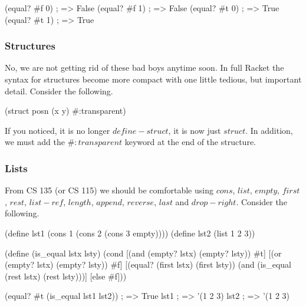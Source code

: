 \begin{code}[Lisp]
(equal? #f 0) ; => False
(equal? #f 1) ; => False
(equal? #t 0) ; => True
(equal? #t 1) ; => True
\end{code}

\subsubsection*{Structures}

No, we are not getting rid of these bad boys anytime soon. In full Racket the syntax for structures become more compact with one little tedious, but important detail. Consider the following.\\


\begin{code}[Lisp]
(struct posn (x y) #:transparent)
\end{code}

If you noticed, it is no longer $define-struct$, it is now just $struct$. In addition, we must add the $\#:transparent$ keyword at the end of the structure.\\


\subsubsection*{Lists}

From CS 135 (or CS 115) we should be comfortable using $cons$, $list$, $empty$, $first$, $rest$, $list-ref$, $length$, $append$, $reverse$, $last$ and $drop-right$. Consider the following.\\


\begin{code}[Lisp]
(define lst1 (cons 1 (cons 2 (cons 3 empty))))
(define lst2 (list 1 2 3))

(define (is_equal lstx lsty)
	(cond
		[(and (empty? lstx) (empty? lsty)) #t]
		[(or (empty? lstx) (empty? lsty)) #f]
		[(equal? (first lstx) (first lsty)) (and (is_equal (rest lstx)
		                                                   (rest lsty)))]
		[else #f]))
	
(equal? #t (is_equal lst1 lst2)) ; => True
lst1 ; => '(1 2 3)
lst2 ; => '(1 2 3)
\end{code}


